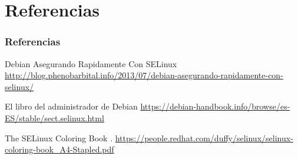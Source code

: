 \documentclass[serif,8pt]{beamer}
\begin{document}
\section{Referencias}
\begin{frame}\frametitle<presentation>{Referencias}
	\begin{thebibliography}{10}
        Debian Asegurando Rapidamente Con SELinux
	      \newblock 
	      \href{http://blog.phenobarbital.info/2013/07/debian-asegurando-rapidamente-con-selinux/}{http://blog.phenobarbital.info/2013/07/debian-asegurando-rapidamente-con-selinux/}

		El libro del administrador de Debian
	      \newblock 
	      \href{https://debian-handbook.info/browse/es-ES/stable/sect.selinux.html}{https://debian-handbook.info/browse/es-ES/stable/sect.selinux.html}

	      The SELinux Coloring Book
	      .
	      \newblock 
	      \href{https://people.redhat.com/duffy/selinux/selinux-coloring-book\_A4-Stapled.pdf}{https://people.redhat.com/duffy/selinux/selinux-coloring-book\_A4-Stapled.pdf}

	      
	\end{thebibliography}
    \end{frame}
\end{document}
